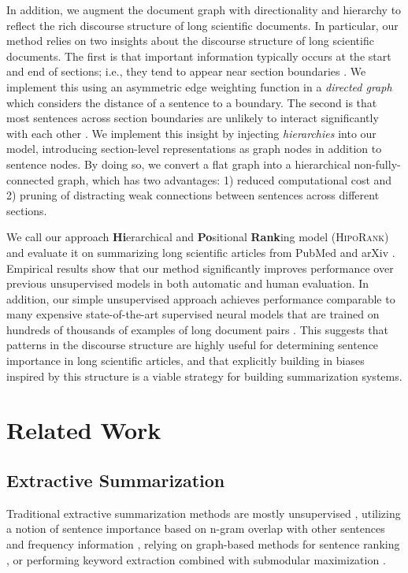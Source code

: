 \documentclass[11pt,a4paper]{article}
\begin{document}
In addition, we augment the document graph with directionality and hierarchy to reflect the rich discourse structure of long scientific documents. In particular, our method relies on two insights about the discourse structure of long scientific documents. The first is that important information typically occurs at the start and end of sections; i.e., they tend to appear near section boundaries \citep{baxendale1958machine,lin1997identifying,teufel1997sentence}. We implement this using an asymmetric edge weighting function in a \textit{directed graph} which considers the distance of a sentence to a boundary. The second is that most sentences across section boundaries are unlikely to interact significantly with each other \citep{xiao2019extractive}. We implement this insight by injecting \textit{hierarchies} into our model, introducing section-level representations as graph nodes in addition to sentence nodes. By doing so, we convert a flat graph into a hierarchical non-fully-connected graph, which has two advantages: 1) reduced computational cost and 2) pruning of distracting weak connections between sentences across different sections.

We call our approach \textbf{Hi}erarchical and \textbf{Po}sitional \textbf{Rank}ing model (\textsc{HipoRank}) and evaluate it on summarizing long scientific articles from PubMed and arXiv \cite{cohan2018discourse}. Empirical results show that our method significantly improves performance over previous unsupervised models \cite{zheng2019sentence,erkan2004lexrank} in both automatic and human evaluation. In addition, our simple unsupervised approach achieves performance comparable to many expensive state-of-the-art supervised neural models that are trained  on hundreds of thousands of examples of long document pairs \cite{xiao2019extractive,subramanian2019extractive}. This suggests that patterns in the discourse structure are highly useful for determining sentence importance in long scientific articles, and that explicitly building in biases inspired by this structure is a viable strategy for building summarization systems.




\section{Related Work}
\subsection{Extractive Summarization}
Traditional extractive summarization methods are
mostly unsupervised \citep{radev2000centroid,lin2002single,wan-2008-exploration,wan2008multi,hirao-etal-2013-single,parveen2015topical,yin2015optimizing,li2017salience,zheng2019sentence}, utilizing a notion of sentence importance based on n-gram overlap with other sentences and frequency information \citep{nenkova2005impact}, relying on graph-based methods for sentence ranking \citep{erkan2004lexrank,mihalcea2004textrank}, or performing keyword extraction combined with submodular maximization \citep{tixier2017combining,shang2018unsupervised}.  
\end{document}
